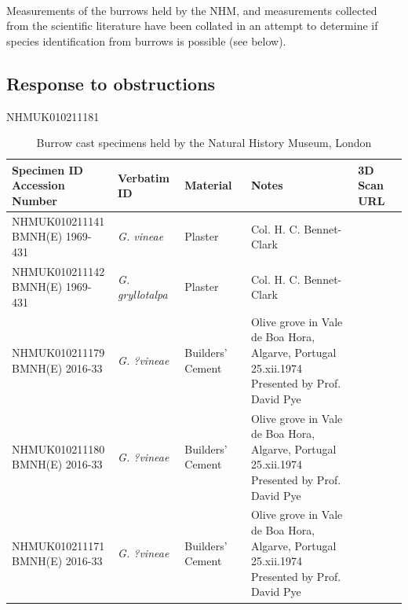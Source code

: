 \documentclass{article}
\begin{document}
   \paragraph{}
   Measurements of the burrows held by the NHM, and measurements collected from the scientific literature have been collated in an attempt to determine if species identification from burrows is possible (see below).
   
   
   \subsection{Response to obstructions}
   NHMUK010211181
    
   \begin{landscape}
   \begin{table}[h]
   	\small
	   \begin{tabular}{|l|l|l|l|l|}
		   	\hline  \makecell[l]{Specimen ID\\Accession Number} &
				   	Verbatim ID &
				   	Material &
				   	Notes &
				   	3D Scan URL\\ 
			 \hline	\makecell[l]{NHMUK010211141\\BMNH(E) 1969-431} &
					\textit{G. vineae} &
					Plaster &
					Col. H. C. Bennet-Clark &
					\\
		   	\hline  \makecell[l]{NHMUK010211142 \\ BMNH(E) 1969-431} &
				   	\textit{G. gryllotalpa} &
				   	Plaster &
				   	Col. H. C. Bennet-Clark &
				   	\\
		   	\hline  \makecell[l]{NHMUK010211179 \\ BMNH(E) 2016-33} &
				   	\textit{G. ?vineae} &
					Builders' Cement &
					\makecell[l]{
						Olive grove in Vale de Boa Hora, Algarve, Portugal \\
						25.xii.1974 \\
						Presented by Prof. David Pye
					} &
					\\ 
		   	\hline  \makecell[l]{NHMUK010211180 \\ BMNH(E) 2016-33} &
				   	\textit{G. ?vineae} &
				   	Builders' Cement &
				   	\makecell[l]{
				   		Olive grove in Vale de Boa Hora, Algarve, Portugal \\
				   		25.xii.1974 \\
				   		Presented by Prof. David Pye
				   	} &
				   	\\ 
		   	\hline  \makecell[l]{NHMUK010211171 \\ BMNH(E) 2016-33} &
				   	\textit{G. ?vineae} &
					Builders' Cement &
					\makecell[l]{
						Olive grove in Vale de Boa Hora, Algarve, Portugal \\
						25.xii.1974 \\
						Presented by Prof. David Pye
					} &
					\\  
		   	\hline 
		\end{tabular}
   \caption{Burrow cast specimens held by the Natural History Museum, London}
   \label{tab:nhm_material}
   \end{table}
   \end{landscape}
\end{document}
